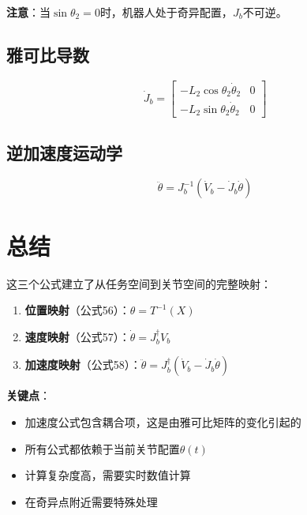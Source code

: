 \documentclass{article}
\begin{document}
\textbf{注意}：当$\sin\theta_2 = 0$时，机器人处于奇异配置，$J_b$不可逆。

\subsection{雅可比导数}

\begin{equation}
\dot{J}_b = \begin{bmatrix}
-L_2\cos\theta_2\dot{\theta}_2 & 0 \\
-L_2\sin\theta_2\dot{\theta}_2 & 0
\end{bmatrix}
\end{equation}

\subsection{逆加速度运动学}

\begin{equation}
\ddot{\theta} = J_b^{-1}\left(\dot{V}_b - \dot{J}_b\dot{\theta}\right)
\end{equation}

\section{总结}

这三个公式建立了从任务空间到关节空间的完整映射：

\begin{enumerate}
\item \textbf{位置映射}（公式56）：$\theta = T^{-1}(X)$
\item \textbf{速度映射}（公式57）：$\dot{\theta} = J_b^{\dagger}V_b$
\item \textbf{加速度映射}（公式58）：$\ddot{\theta} = J_b^{\dagger}(\dot{V}_b - \dot{J}_b\dot{\theta})$
\end{enumerate}

\textbf{关键点}：
\begin{itemize}
\item 加速度公式包含耦合项，这是由雅可比矩阵的变化引起的
\item 所有公式都依赖于当前关节配置$\theta(t)$
\item 计算复杂度高，需要实时数值计算
\item 在奇异点附近需要特殊处理
\end{itemize}
\end{document}
